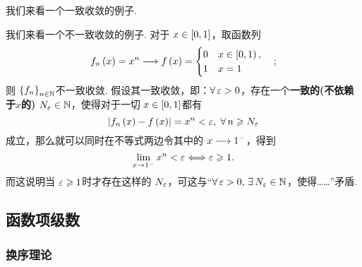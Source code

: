 \begin{definition}[(函数项级数)有界]
    
\end{definition}
\begin{definition}
    
\end{definition}
\begin{definition}[(函数项级数)收敛]
    
\end{definition}
\begin{definition}
    
\end{definition}
\begin{example}
    我们来看一个一致收敛的例子.
\end{example}
\begin{example}\label{不一致收敛例子}
    我们来看一个不一致收敛的例子. 对于 $x\in\left[0,1\right]$，取函数列
    \[   f_n\left(x\right)=x^n \longrightarrow f\left(x\right)= \begin{cases}
        0 \quad x\in\left[0,1\right), \\
        1 \quad x=1
    \end{cases};   \]
    则 $\left\{f_n\right\}_{n\in\mathbb{N}}$不一致收敛. 假设其一致收敛，即：$\forall\,\varepsilon >0$，存在一个\textbf{一致的(不依赖于$x$的)} $N_\varepsilon\in\mathbb{N}$，使得对于一切 $x\in\left[0,1\right]$都有
    \[ \left|f_n\left(x\right)-f\left(x\right)\right|=x^n <\varepsilon,\;\forall\,n\geqslant N_\varepsilon \]
    成立，那么就可以同时在不等式两边令其中的 $x\longrightarrow 1^-$，得到
    \[   \lim_{x\to 1^-} x^n<\varepsilon \Longleftrightarrow \varepsilon\geqslant 1.    \]
    而这说明当 $\varepsilon \geqslant 1$时才存在这样的 $N_\varepsilon$，可这与“$\forall\,\varepsilon>0,\,\exists\,N_\varepsilon\in\mathbb{N}$，使得……”矛盾.
\end{example}

\subsection{函数项级数}



\subsubsection{换序理论}\label{换序理论}

